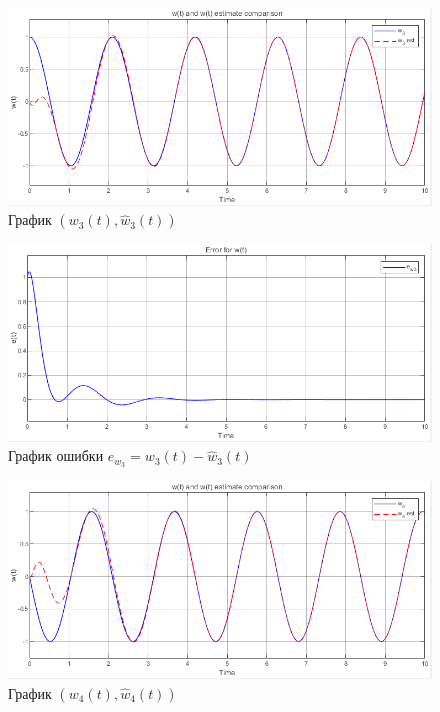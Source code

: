 \documentclass[a4paper, 12pt]{article}
\begin{document}
    \begin{figure}[H]
        \centering
        \includegraphics[scale=0.75]{2task_w3.png}
        \captionsetup{skip=0pt}
        \caption{График $(w_3(t),\hat{w}_3(t))$}
        \label{fig:2task_w3}
    \end{figure}
    \begin{figure}[H]
        \centering
        \includegraphics[scale=0.75]{2task_ew3.png}
        \captionsetup{skip=0pt}
        \caption{График ошибки $e_{w_3}=w_3(t)-\hat{w}_3(t)$}
        \label{fig:2task_ew3}
    \end{figure}
    \begin{figure}[H]
        \centering
        \includegraphics[scale=0.75]{2task_w4.png}
        \captionsetup{skip=0pt}
        \caption{График $(w_4(t),\hat{w}_4(t))$}
        \label{fig:2task_w4}
    \end{figure}
\end{document}
